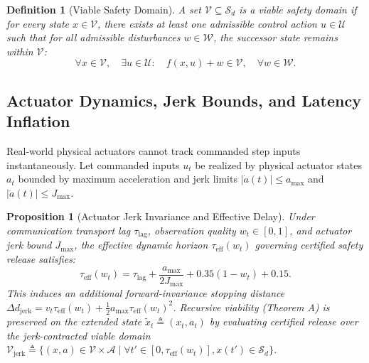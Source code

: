 \documentclass[conference]{IEEEtran}
\newtheorem{definition}{Definition}
\newtheorem{proposition}{Proposition}
\begin{document}
\begin{definition}[Viable Safety Domain]
A set $\mathcal{V} \subseteq \mathcal{S}_d$ is a \emph{viable safety domain} if for every state $x \in \mathcal{V}$, there exists at least one admissible control action $u \in \mathcal{U}$ such that for all admissible disturbances $w \in \mathcal{W}$, the successor state remains within $\mathcal{V}$:
\begin{equation}
\forall x \in \mathcal{V}, \quad \exists u \in \mathcal{U}: \quad f(x, u) + w \in \mathcal{V}, \quad \forall w \in \mathcal{W}.
\end{equation}
\end{definition}

\subsection{Actuator Dynamics, Jerk Bounds, and Latency Inflation}
Real-world physical actuators cannot track commanded step inputs instantaneously. Let commanded inputs $u_t$ be realized by physical actuator states $a_t$ bounded by maximum acceleration and jerk limits $|\dot{a}(t)| \le a_{\max}$ and $|\ddot{a}(t)| \le J_{\max}$. 
\begin{proposition}[Actuator Jerk Invariance and Effective Delay]
Under communication transport lag $\tau_{\mathrm{lag}}$, observation quality $w_t \in [0, 1]$, and actuator jerk bound $J_{\max}$, the effective dynamic horizon $\tau_{\mathrm{eff}}(w_t)$ governing certified safety release satisfies:
\begin{equation}
\tau_{\mathrm{eff}}(w_t) = \tau_{\mathrm{lag}} + \frac{a_{\max}}{2 J_{\max}} + 0.35(1 - w_t) + 0.15.
\end{equation}
This induces an additional forward-invariance stopping distance $\Delta d_{\mathrm{jerk}} = v_t \tau_{\mathrm{eff}}(w_t) + \frac{1}{2} a_{\max} \tau_{\mathrm{eff}}(w_t)^2$. Recursive viability (Theorem A) is preserved on the extended state $\tilde{x}_t \triangleq (x_t, a_t)$ by evaluating certified release over the jerk-contracted viable domain $\mathcal{V}_{\mathrm{jerk}} \triangleq \{ (x, a) \in \mathcal{V} \times \mathcal{A} \mid \forall t' \in [0, \tau_{\mathrm{eff}}(w_t)], x(t') \in \mathcal{S}_d \}$.
\end{proposition}
\end{document}
